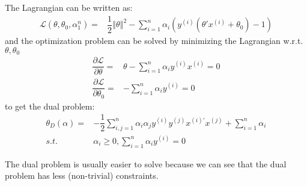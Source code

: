 \documentclass[11pt,a4paper]{ctexart}
\numberwithin{equation}{section}%
\begin{document}
The Lagrangian can be written as:
\begin{align*}
    \mathcal{L}(\theta ,\theta _0,\alpha_1^n  )=& \dfrac{ 1 }{ 2 }\left\Vert \theta  \right\Vert ^2 - \sum_{i=1}^n \alpha _i \left( y^{(i)}(\theta 'x^{(i)} +\theta _0) -1 \right) 
\end{align*}
and the optimization problem can be solved by minimizing the Lagrangian w.r.t. $ \theta ,\theta _0 $ 
\begin{align*}
    \dfrac{ \partial \mathcal{L} }{ \partial \theta  }=& \theta - \sum_{i=1}^n \alpha _i y^{(i)}x^{(i)} =0\\
    \dfrac{ \partial \mathcal{L} }{ \partial \theta _0 }=& - \sum_{i=1}^n \alpha _i y^{(i)} =0
\end{align*}
to get the dual problem:
\begin{align*}
     \theta _D(\alpha )=& -\dfrac{ 1 }{ 2 }\sum_{i,j=1}^n \alpha _i \alpha _j y^{(i)}y^{(j)}x^{(i)'}x^{(j)} + \sum_{i=1}^n \alpha _i \\
     s.t. & \alpha _i \geq 0, \sum_{i=1}^n \alpha _i y^{(i)} =0
\end{align*}


The dual problem is usually easier to solve because we can see that the dual problem has less (non-trivial) constraints.
\end{document}
